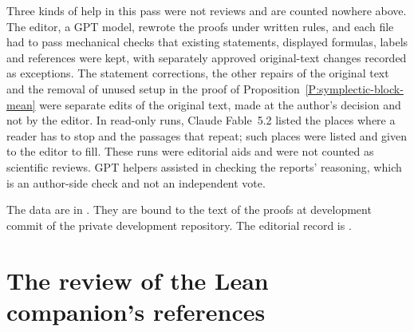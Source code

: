 Three kinds of help in this pass were not reviews and are counted nowhere
above. The editor, a GPT model, rewrote the proofs under written rules, and
each file had to pass mechanical checks that existing statements, displayed
formulas, labels and references were kept, with separately approved
original-text changes recorded as exceptions. The
\aiRereadStatementsChanged{} statement corrections, the other repairs of the
original text and the removal of unused setup in the proof of
Proposition~\ref{P:symplectic-block-mean} were separate edits of the original
text, made at the author's decision and not by the editor. In \aiRereadReaderRuns{} read-only runs,
Claude Fable~5.2 listed the places where a reader has to stop and the
passages that repeat; \aiRereadStopPoints{} such places were listed and given to the editor to
fill. These runs were editorial aids and were not counted as scientific
reviews. GPT helpers assisted in checking the reports'
reasoning, which is an author-side check and not an independent vote.

The data are in . They are
bound to the text of the proofs at development commit
\texttt{\aiRereadSource} of the private development repository. The
editorial record is
.

\section*{The review of the Lean companion's references}

